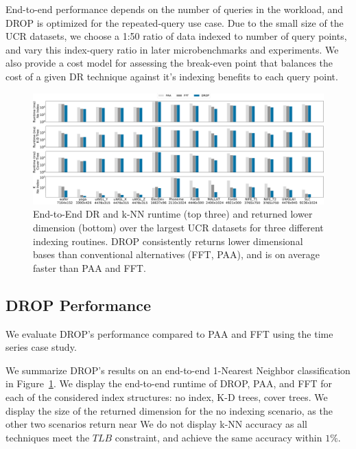 End-to-end performance depends on the number of queries in the workload, and DROP is optimized for the repeated-query use case. 
Due to the small size of the UCR datasets, we choose a 1:50 ratio of data indexed to number of query points, and vary this index-query ratio in later microbenchmarks and experiments. 
We also provide a cost model for assessing the break-even point that balances the cost of a given DR technique against it's indexing benefits to each query point.


\begin{figure}[t!]
\includegraphics[width=\linewidth]{figs/KNNraw-revision.pdf}
\caption[]{End-to-End DR and k-NN runtime (top three) and returned lower dimension (bottom) over the largest UCR datasets for three different indexing routines. DROP consistently returns lower dimensional bases than conventional alternatives (FFT, PAA), and is on average faster than PAA and FFT.}
\label{fig:knnAll}
\end{figure}


\subsection{DROP Performance}
\label{subsec:runtime}


We evaluate DROP's performance compared to PAA and FFT using the time series case study. 

 We summarize DROP's results on an end-to-end 1-Nearest Neighbor classification in Figure~\ref{fig:knnAll}.
We display the end-to-end runtime of DROP, PAA, and FFT for each of the considered index structures: no index, K-D trees, cover trees. 
We display the size of the returned dimension for the no indexing scenario, as the other two scenarios return near 
We do not display k-NN accuracy as all techniques meet the $TLB$ constraint, and achieve the same accuracy within $1\%$.

